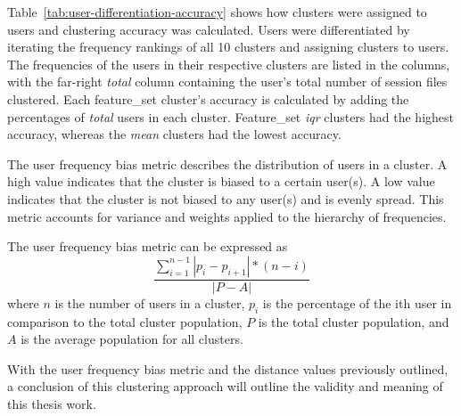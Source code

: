 Table~\ref{tab:user-differentiation-accuracy} shows how clusters were assigned to users and clustering accuracy was calculated. Users were differentiated by iterating the frequency rankings of all 10 clusters and assigning clusters to users. The frequencies of the users in their respective clusters are listed in the columns, with the far-right \textit{total} column containing the user's total number of session files clustered. Each feature{\_}set cluster's accuracy is calculated by adding the percentages of \textit{total} users in each cluster. Feature{\_}set \textit{iqr} clusters had the highest accuracy, whereas the \textit{mean} clusters had the lowest accuracy.

The user frequency bias metric describes the distribution of users in a cluster.
A high value indicates that the cluster is biased to a certain user(s).
A low value indicates that the cluster is not biased to any user(s) and is evenly spread. This metric accounts for variance and weights applied to the hierarchy of frequencies.

The user frequency bias metric can be expressed as
\[ \frac{\sum_{i=1}^{n-1} |p_i - p_{i+1}| * (n-i)}{|P-A|} \]
where $n$ is the number of users in a cluster, $p_i$ is the percentage of the ith user in comparison to the total cluster population, $P$ is the total cluster population, and $A$ is the average population for all clusters.

With the user frequency bias metric and the distance values previously outlined, a conclusion of this clustering approach will outline the validity and meaning of this thesis work.

%
